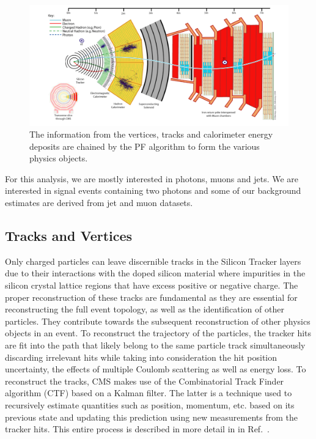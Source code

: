 \begin{figure}[!htb]
	\centering
	\includegraphics[scale=0.6]{fig/CMSParticleFlow.png}
	\caption{The information from the vertices, tracks and calorimeter energy deposits are chained by the PF algorithm to form the various physics objects.}
	\label{fig:CMSParticleFlow}
\end{figure}

For this analysis, we are mostly interested in photons, muons and jets. We are interested in signal events containing two photons and some of our background estimates are derived from jet and muon datasets. 


\subsection{Tracks and Vertices}\label{sec:track_vertex}

Only charged particles can leave discernible tracks in the Silicon Tracker layers due to their interactions with the doped silicon material where impurities in the silicon crystal lattice regions that have excess positive or negative charge. The proper reconstruction of these tracks are fundamental as they are essential for reconstructing the full event topology, as well as the identification of other particles. They contribute towards the subsequent reconstruction of other physics objects in an event. To reconstruct the trajectory of the particles, the tracker hits are fit into the path that likely belong to the same particle track simultaneously discarding irrelevant hits while taking into consideration the hit position uncertainty, the effects of multiple Coulomb scattering as well as energy loss. To reconstruct the tracks, CMS makes use of the Combinatorial Track Finder algorithm (CTF) based on a Kalman filter. The latter is a technique used to recursively estimate quantities such as position, momentum, etc. based on its previous state and updating this prediction using new measurements from the tracker hits. This entire process is described in more detail in in Ref.~\cite{Chatrchyan:2014fea}.


